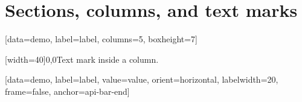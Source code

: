 \documentclass[type=report,theme=light,language=de]{semio}
\begin{document}
\section{Sections, columns, and text marks}
\begin{VizFigure}[title={Section, column, text}, width=100]
\begin{VizSection}[title={A \ Section title}]
[data=demo, label=label, columns=5, boxheight=7]
\end{VizSection}
\begin{VizSection}[title={B \ Two columns}]
\begin{VizColumn}[width=48, title={Left}]
[width=40]{0,0}{Text mark inside a column.}
\end{VizColumn}
\begin{VizColumn}[width=48, title={Right}, note={Caption text before the chart.}]
[data=demo, label=label, value=value, orient=horizontal, labelwidth=20, frame=false, anchor=api-bar-end]
\end{VizColumn}
\end{VizSection}
\end{VizFigure}
\end{document}
